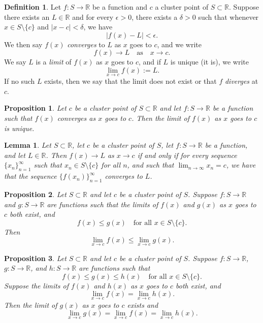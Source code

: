 \documentclass{article}
\newtheorem{lemma}{Lemma}[section]
\newtheorem{proposition}{Proposition}[section]
\theoremstyle{definition}
\newtheorem{definition}{Definition}[section]
\theoremstyle{remark}
\begin{document}
\begin{definition}
Let $f : S \to \mathbb{R}$ be a function and $c$ a cluster point of $S \subset \mathbb{R}$. Suppose there exists an $L \in \mathbb{R}$ and for every $\epsilon > 0$, there exists a $\delta > 0$ such that whenever $x \in S \setminus \{c\}$ and $|x - c| < \delta$, we have
\[
|f(x) - L| < \epsilon.
\]
We then say $f(x)$ \textit{converges} to $L$ as $x$ goes to $c$, and we write
\[
f(x) \to L \quad \text{as} \quad x \to c.
\]
We say $L$ is a \textit{limit} of $f(x)$ as $x$ goes to $c$, and if $L$ is unique (it is), we write
\[
\lim_{x\to c} f(x) := L.
\]
If no such $L$ exists, then we say that the limit does not exist or that $f$ \textit{diverges} at $c$.

\end{definition}

\begin{proposition}
Let $c$ be a cluster point of $S \subset \mathbb{R}$ and let $f : S \to \mathbb{R}$ be a function such that $f(x)$ converges as $x$ goes to $c$. Then the limit of $f(x)$ as $x$ goes to $c$ is unique.
\end{proposition}



\begin{lemma}
Let $S \subset \mathbb{R}$, let $c$ be a cluster point of $S$, let $f : S \to \mathbb{R}$ be a function, and let $L \in \mathbb{R}$. Then $f(x) \to L$ as $x \to c$ if and only if for every sequence $\{x_n\}_{n=1}^{\infty}$ such that $x_n \in S \setminus \{c\}$ for all $n$, and such that $\lim_{n\to\infty} x_n = c$, we have that the sequence $\{f(x_n)\}_{n=1}^{\infty}$ converges to $L$.
\end{lemma}






\begin{proposition}
Let $S \subset \mathbb{R}$ and let $c$ be a cluster point of $S$. Suppose $f : S \to \mathbb{R}$ and $g : S \to \mathbb{R}$ are functions such that the limits of $f(x)$ and $g(x)$ as $x$ goes to $c$ both exist, and
\[
f(x) \leq g(x) \quad \text{for all } x \in S \setminus \{c\}.
\]
Then
\[
\lim_{x\to c} f(x) \leq \lim_{x\to c} g(x).
\]
\end{proposition}

\begin{proposition}
Let $S \subset \mathbb{R}$ and let $c$ be a cluster point of $S$. Suppose $f : S \to \mathbb{R}$, $g : S \to \mathbb{R}$, and $h : S \to \mathbb{R}$ are functions such that
\[
f(x) \leq g(x) \leq h(x) \quad \text{for all } x \in S \setminus \{c\}.
\]
Suppose the limits of $f(x)$ and $h(x)$ as $x$ goes to $c$ both exist, and
\[
\lim_{x\to c} f(x) = \lim_{x\to c} h(x).
\]
Then the limit of $g(x)$ as $x$ goes to $c$ exists and
\[
\lim_{x\to c} g(x) = \lim_{x\to c} f(x) = \lim_{x\to c} h(x).
\]
\end{proposition}
\end{document}
